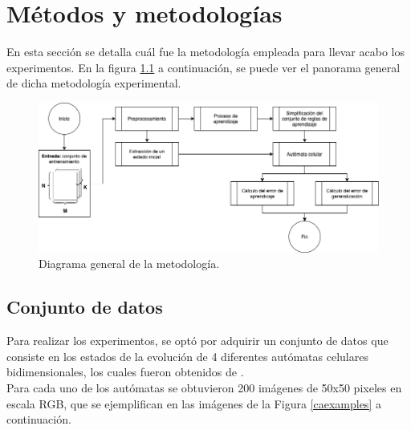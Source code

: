 \chapter{Métodos y metodologías}

En esta sección se detalla cuál fue la metodología empleada para llevar acabo los experimentos. En la figura \ref{fig:metodologia} a continuación, se puede ver el panorama general de dicha metodología experimental.

\begin{figure}[H]
	\centering
	\includegraphics[width=\linewidth]{fig/metodologia}
	\caption{Diagrama general de la metodología.}
	\label{fig:metodologia}
\end{figure}

\section{Conjunto de datos}

Para realizar los experimentos, se optó por adquirir un conjunto de datos que consiste en los estados de la evolución de 4 diferentes autómatas celulares bidimensionales, los cuales fueron obtenidos de \cite{rucker_walker}.
\\
Para cada uno de los autómatas se obtuvieron 200 imágenes de 50x50 pixeles en escala RGB, que se ejemplifican en las imágenes de la Figura \ref{caexamples} a continuación.

